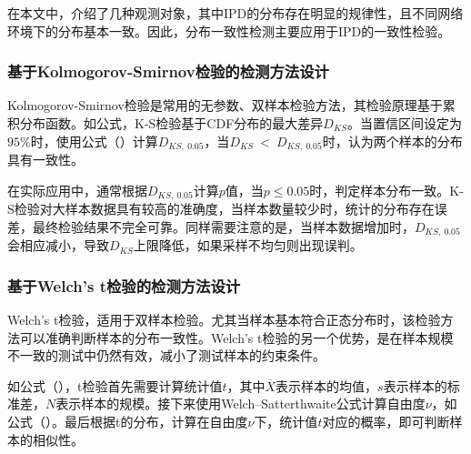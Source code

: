 在本文中，介绍了几种观测对象，其中IPD的分布存在明显的规律性，且不同网络环境下的分布基本一致。因此，分布一致性检测主要应用于IPD的一致性检验。

\subsubsection{基于Kolmogorov-Smirnov检验的检测方法设计}
\label{chap:analyze:statistical:test:ks}

Kolmogorov-Smirnov检验是常用的无参数、双样本检验方法，其检验原理基于累积分布函数。如公式，K-S检验基于CDF分布的最大差异$D_{KS}$。当置信区间设定为$95\%$时，使用公式（）计算$D_{KS,\ 0.05}$，当$D_{KS}\ <\ D_{KS,\ 0.05}$时，认为两个样本的分布具有一致性。

在实际应用中，通常根据$D_{KS,\ 0.05}$计算$p$值，当$p\leq 0.05$时，判定样本分布一致。K-S检验对大样本数据具有较高的准确度，当样本数量较少时，统计的分布存在误差，最终检验结果不完全可靠。同样需要注意的是，当样本数据增加时，$D_{KS,\ 0.05}$会相应减小，导致$D_{KS}$上限降低，如果采样不均匀则出现误判。

\subsubsection{基于Welch's t检验的检测方法设计}
\label{chap:analyze:statistical:test:t}

Welch's t检验，适用于双样本检验。尤其当样本基本符合正态分布时，该检验方法可以准确判断样本的分布一致性。Welch's t检验的另一个优势，是在样本规模不一致的测试中仍然有效，减小了测试样本的约束条件。


如公式（），t检验首先需要计算统计值$t$，其中$\overline{X}$表示样本的均值，$s$表示样本的标准差，$N$表示样本的规模。接下来使用Welch–Satterthwaite公式计算自由度$\nu$，如公式（）。最后根据t的分布，计算在自由度$\nu$下，统计值$t$对应的概率，即可判断样本的相似性。

